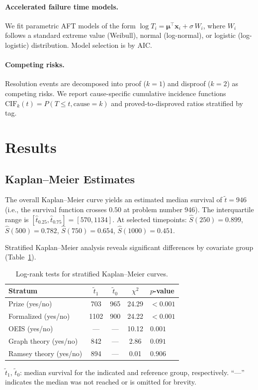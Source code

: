 \documentclass[11pt]{article}
\newcommand{\AIC}{\mathrm{AIC}}
\newcommand{\CIF}{\mathrm{CIF}}
\begin{document}
\paragraph{Accelerated failure time models.}
We fit parametric AFT models of the form
$\log T_i = \boldsymbol\mu^\top \mathbf{x}_i + \sigma\, W_i$,
where $W_i$ follows a standard extreme value (Weibull), normal
(log-normal), or logistic (log-logistic) distribution. Model
selection is by $\AIC$.

\paragraph{Competing risks.}
Resolution events are decomposed into proof ($k = 1$) and disproof
($k = 2$) as competing risks. We report cause-specific cumulative
incidence functions $\CIF_k(t) = P(T \le t, \text{cause} = k)$
and proved-to-disproved ratios stratified by tag.


\section{Results}

\subsection{Kaplan--Meier Estimates}

The overall Kaplan--Meier curve yields an estimated median survival
of $\tilde t = 946$ (i.e., the survival function crosses $0.50$
at problem number 946). The interquartile range is
$[\hat t_{0.25}, \hat t_{0.75}] = [570, 1134]$. At selected
timepoints: $\hat S(250) = 0.899$, $\hat S(500) = 0.782$,
$\hat S(750) = 0.654$, $\hat S(1000) = 0.451$.

Stratified Kaplan--Meier analysis reveals significant differences
by covariate group (Table~\ref{tab:logrank}).

\begin{table}[ht]
\centering
\caption{Log-rank tests for stratified Kaplan--Meier curves.}
\label{tab:logrank}
\begin{tabular}{@{}lcccl@{}}
\toprule
Stratum & $\tilde t_1$ & $\tilde t_0$ & $\chi^2$ & $p$-value \\
\midrule
Prize (yes/no)         & 703  & 965  & 24.29 & $< 0.001$ \\
Formalized (yes/no)    & 1102 & 900  & 24.22 & $< 0.001$ \\
OEIS (yes/no)          & ---  & ---  & 10.12 & $0.001$ \\
Graph theory (yes/no)  & 842  & ---  & 2.86  & $0.091$ \\
Ramsey theory (yes/no) & 894  & ---  & 0.01  & $0.906$ \\
\bottomrule
\end{tabular}
\raggedright
\small $\tilde t_1$, $\tilde t_0$: median survival for the indicated
and reference group, respectively. ``---'' indicates the median was
not reached or is omitted for brevity.
\end{table}
\end{document}
